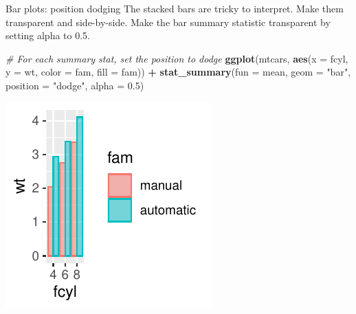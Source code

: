 \documentclass[
  ignorenonframetext,
]{beamer}
\newenvironment{Shaded}{\begin{snugshade}}{\end{snugshade}}
\newcommand{\AttributeTok}[1]{\textcolor[rgb]{0.13,0.29,0.53}{#1}}
\newcommand{\CommentTok}[1]{\textcolor[rgb]{0.56,0.35,0.01}{\textit{#1}}}
\newcommand{\FloatTok}[1]{\textcolor[rgb]{0.00,0.00,0.81}{#1}}
\newcommand{\FunctionTok}[1]{\textcolor[rgb]{0.13,0.29,0.53}{\textbf{#1}}}
\newcommand{\NormalTok}[1]{#1}
\newcommand{\SpecialCharTok}[1]{\textcolor[rgb]{0.81,0.36,0.00}{\textbf{#1}}}
\newcommand{\StringTok}[1]{\textcolor[rgb]{0.31,0.60,0.02}{#1}}
\begin{document}
\begin{frame}[fragile]{Bar plots: position dodging}
\label{bar-plots-position-dodging-2}
The stacked bars are tricky to interpret. Make them transparent and
side-by-side. Make the bar summary statistic transparent by setting
alpha to 0.5.


\begin{Shaded}
\begin{Highlighting}[]
\CommentTok{\# For each summary stat, set the position to dodge}
\FunctionTok{ggplot}\NormalTok{(mtcars, }\FunctionTok{aes}\NormalTok{(}\AttributeTok{x =}\NormalTok{ fcyl, }\AttributeTok{y =}\NormalTok{ wt, }\AttributeTok{color =}\NormalTok{ fam, }\AttributeTok{fill =}\NormalTok{ fam)) }\SpecialCharTok{+}
    \FunctionTok{stat\_summary}\NormalTok{(}\AttributeTok{fun =}\NormalTok{ mean, }\AttributeTok{geom =} \StringTok{"bar"}\NormalTok{, }\AttributeTok{position =} \StringTok{"dodge"}\NormalTok{,}
        \AttributeTok{alpha =} \FloatTok{0.5}\NormalTok{)}
\end{Highlighting}
\end{Shaded}

\begin{center}\includegraphics[width=0.5\linewidth]{Figs/unnamed-chunk-106-1} \end{center}
\end{frame}
\end{document}
